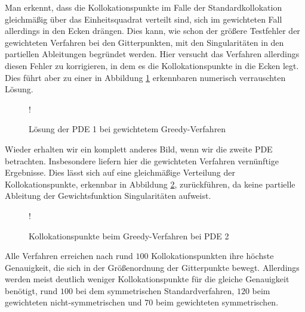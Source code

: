 Man erkennt, dass die Kollokationspunkte im Falle der Standardkollokation gleichmäßig über das Einheitsquadrat verteilt sind, sich im gewichteten Fall allerdings in den Ecken drängen. Dies kann, wie schon der größere Testfehler der gewichteten Verfahren bei den Gitterpunkten, mit den Singularitäten in den partiellen Ableitungen begründet werden. Hier versucht das Verfahren allerdings diesen Fehler zu korrigieren, in dem es die Kollokationspunkte in die Ecken legt. Dies führt aber zu einer in Abbildung \ref{fig:greedy-verrauscht} erkennbaren numerisch verrauschten Lösung. 

\begin{figure}[ht]
\centering
\resizebox {\columnwidth} {!} {

}
\caption{Lösung der \acs{PDE} 1 bei gewichtetem Greedy-Verfahren}
\label{fig:greedy-verrauscht}
\end{figure}

Wieder erhalten wir ein komplett anderes Bild, wenn wir die zweite \ac{PDE} betrachten. Insbesondere liefern hier die gewichteten Verfahren vernünftige Ergebnisse. Dies lässt sich auf eine gleichmäßige Verteilung der Kollokationspunkte, erkennbar in Abbildung \ref{fig:greedy-points2}, zurückführen, da keine partielle Ableitung der Gewichtsfunktion Singularitäten aufweist. 
\begin{figure}[ht]
\centering
\resizebox {\columnwidth} {!} {

}
\caption{Kollokationspunkte beim Greedy-Verfahren bei \acs{PDE} 2}
\label{fig:greedy-points2}
\end{figure}
Alle Verfahren erreichen nach rund $100$ Kollokationspunkten ihre höchste Genauigkeit, die sich in der Größenordnung der Gitterpunkte bewegt. Allerdings werden meist deutlich weniger Kollokationspunkte für die gleiche Genauigkeit benötigt, rund $100$ bei dem symmetrischen Standardverfahren, $120$ beim gewichteten nicht-symmetrischen und $70$ beim gewichteten symmetrischen.

